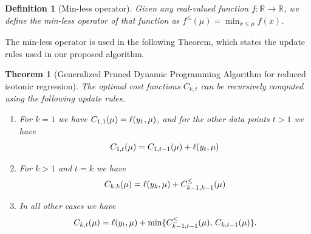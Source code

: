 \documentclass{article}
\newtheorem{theorem}{Theorem}
\newtheorem{definition}{Definition}
\newcommand{\RR}{\mathbb R}
\begin{document}
\begin{definition}[Min-less operator]
\label{def:min-less}
  Given any real-valued function $f:\RR\rightarrow\RR$, we define the min-less
  operator of that function as $f^\leq(\mu)=\min_{x\leq \mu} f(x)$.
\end{definition}

The min-less operator is used in the following Theorem, which states
the update rules used in our proposed algorithm.

\begin{theorem}[Generalized Pruned Dynamic Programming Algorithm
  for reduced isotonic regression]
\label{thm:gpdpa}
  The optimal cost functions $C_{k,t}$ can be recursively computed
  using the following update rules.
\begin{enumerate}
\item For $k=1$ we have
$C_{1,1}(\mu)=\ell(y_1,\mu)$, and for the other data
  points $t>1$ we have
\begin{equation}
C_{1,t}(\mu)=C_{1,t-1}(\mu)+\ell(y_t,\mu)
\end{equation}
\item For $k>1$ and $t=k$ we have
\begin{equation}
  C_{k,k}(\mu)=\ell(y_k, \mu)+C_{k-1,k-1}^\leq(\mu)
\end{equation}
\item In all other cases we have
  \begin{equation}
  C_{k,t}(\mu)=\ell(y_t,\mu)+
  \min\{
  C_{k-1,t-1}^\leq(\mu),\,
  C_{k,t-1}(\mu)
  \}.
  \end{equation}
\end{enumerate}
\end{theorem}
\end{document}
